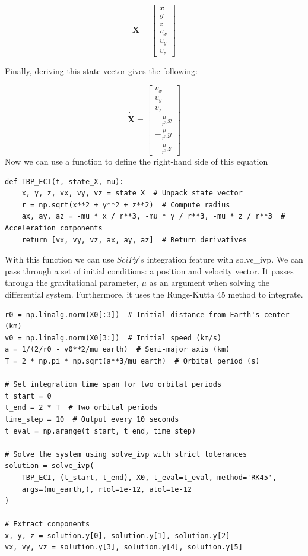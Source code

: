 \documentclass[12pt,twocolumn]{article}  %
\begin{document}
\begin{equation}
    \mathbf{\bar{X}} = 
    \begin{bmatrix}
        x \\
        y \\
        z \\
        v_x \\
        v_y \\
        v_z
        \end{bmatrix}
\end{equation}

Finally, deriving this state vector gives the following:

\begin{equation}
    \mathbf{\dot{\bar{X}}} = 
    \begin{bmatrix}
        v_x \\
        v_y \\
        v_z \\
        -\frac{\mu}{r^3} x \\
        -\frac{\mu}{r^3} y \\
        -\frac{\mu}{r^3} z
        \end{bmatrix}
\end{equation}
Now we can use a function to define the right-hand side of this equation
\begin{lstlisting}
def TBP_ECI(t, state_X, mu):
    x, y, z, vx, vy, vz = state_X  # Unpack state vector
    r = np.sqrt(x**2 + y**2 + z**2)  # Compute radius
    ax, ay, az = -mu * x / r**3, -mu * y / r**3, -mu * z / r**3  # Acceleration components
    return [vx, vy, vz, ax, ay, az]  # Return derivatives
\end{lstlisting}
With this function we can use $SciPy's$ integration feature with solve\_ivp. We can pass 
through a set of initial conditions: a position and velocity vector. It passes through the 
gravitational parameter, $\mu$ as an argument when solving the differential system. Furthermore, 
it uses the Runge-Kutta 45 method to integrate. 
\begin{lstlisting}
r0 = np.linalg.norm(X0[:3])  # Initial distance from Earth's center (km)
v0 = np.linalg.norm(X0[3:])  # Initial speed (km/s)
a = 1/(2/r0 - v0**2/mu_earth)  # Semi-major axis (km)
T = 2 * np.pi * np.sqrt(a**3/mu_earth)  # Orbital period (s)

# Set integration time span for two orbital periods
t_start = 0
t_end = 2 * T  # Two orbital periods
time_step = 10  # Output every 10 seconds
t_eval = np.arange(t_start, t_end, time_step)  

# Solve the system using solve_ivp with strict tolerances
solution = solve_ivp(
    TBP_ECI, (t_start, t_end), X0, t_eval=t_eval, method='RK45',
    args=(mu_earth,), rtol=1e-12, atol=1e-12
)

# Extract components
x, y, z = solution.y[0], solution.y[1], solution.y[2]
vx, vy, vz = solution.y[3], solution.y[4], solution.y[5]
\end{lstlisting}
\end{document}
